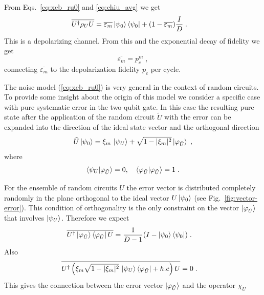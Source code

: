 From Eqs.~\eqref{eq:xeb_ru0} and \eqref{eq:chiu_avg} we get
\begin{align}
  \overline{U^{\dagger}\rho_U U} &= \overline{\varepsilon_m} \mathinner{|{\psi_0}\rangle}\mathinner{\langle{\psi_0}|} + (1-\overline{\varepsilon_m}) \frac I D \;.\label{eq:dcm}
\end{align}
This is a depolarizing channel. From this and the exponential decay of fidelity we get 
\begin{equation}
\overline{\varepsilon_m}=p_c^m\;,\label{eq:Fd}
\end{equation}
connecting $\overline{\varepsilon_m}$ to the depolarization fidelity $p_c$   per cycle.  

The noise model (\ref{eq:xeb_ru0}) is very general in the context of random circuits. To
 provide some insight about the origin of this model we consider a specific case with pure systematic error in the two-qubit gate. In this case the resulting pure state after the application of the random circuit $\tilde U$ with the error can be expanded  into the direction of the ideal state vector and the orthogonal direction
 \begin{equation}
   \tilde U\mathinner{|{\psi_0}\rangle}=\xi_m\, \mathinner{|{\psi_U}\rangle} +\sqrt{1-|\xi_m|^2}\mathinner{|{\varphi_{\tilde U}}\rangle}\;,\label{eq:Psi-er}
 \end{equation}
 where 
 \begin{equation}
 \mathinner{\langle{\psi_U}|\varphi_{\tilde U} \rangle}=0,\quad \mathinner{\langle{\varphi_{\tilde U}}|\varphi_{\tilde U} \rangle}=1\;.\label{eq:cond}
 \end{equation}
 
 For the ensemble of random circuits $U$ the error vector  is distributed completely randomly in the  plane orthogonal to the ideal vector $U\mathinner{|{\psi_0}\rangle}$ (see Fig.~\ref{fig:vector-error}).
This condition of orthogonality is the only constraint on the vector $\mathinner{|{\varphi_{\tilde U}}\rangle}$ that involves  $\mathinner{|{\psi_U}\rangle}$.
Therefore we expect
\begin{align}
  \overline{U^{\dagger}\mathinner{|{\varphi_{\tilde U}}\rangle}\mathinner{\langle{\varphi_{\tilde U}}|} U} &= \frac 1 {D-1} (I - \mathinner{|{\psi_0}\rangle}\mathinner{\langle{\psi_0}|})\;.\label{eq:xeb_uvu}
 \end{align}
 Also
 \begin{align}
   \overline{U^\dagger\left(\xi_m\sqrt{1-|\xi_m|^2}\, \mathinner{|{\psi_U}\rangle}\mathinner{\langle{\varphi_{\tilde U}}|} +h.c\right)U} &= 0\;.
\end{align}
This gives  the connection between the error vector $\mathinner{|{\varphi_{\tilde U}}\rangle}$ and the operator $\chi_U$ 


